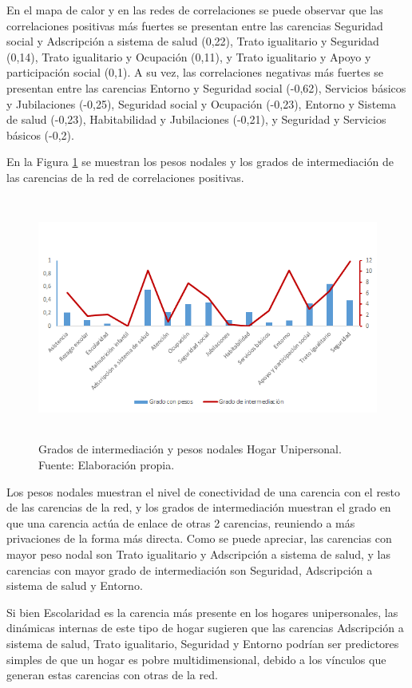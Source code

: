 \documentclass[12pt,letterpaper,spanish]{article}
\begin{document}
En el mapa de calor y en las redes de correlaciones se puede observar que las correlaciones positivas más fuertes se presentan entre las carencias Seguridad social y Adscripción a sistema de salud (0,22), Trato igualitario y Seguridad (0,14), Trato igualitario y Ocupación (0,11), y Trato igualitario y Apoyo y participación social (0,1). A su vez, las correlaciones negativas más fuertes se presentan entre las carencias Entorno y Seguridad social (-0,62), Servicios básicos y Jubilaciones (-0,25), Seguridad social y Ocupación (-0,23), Entorno y Sistema de salud (-0,23), Habitabilidad y Jubilaciones (-0,21), y Seguridad y Servicios básicos (-0,2).

En la Figura \ref{CenUni} se muestran los pesos nodales y los grados de intermediación de las carencias de la red de correlaciones positivas.
\begin{figure}[H]
    \centering
    \includegraphics[height=8cm]{Grafos/nc_unipersonal.png}
    \caption{Grados de intermediación y pesos nodales Hogar Unipersonal. Fuente: Elaboración propia.}
    \label{CenUni}
\end{figure}
Los pesos nodales muestran el nivel de conectividad de una carencia con el resto de las carencias de la red, y los grados de intermediación muestran el grado en que una carencia actúa de enlace de otras 2 carencias, reuniendo a más privaciones de la forma más directa. Como se puede apreciar, las carencias con mayor peso nodal son Trato igualitario y Adscripción a sistema de salud, y las carencias con mayor grado de intermediación son Seguridad, Adscripción a sistema de salud y Entorno. 

Si bien Escolaridad es la carencia más presente en los hogares unipersonales, las dinámicas internas de este tipo de hogar sugieren que las carencias Adscripción a sistema de salud, Trato igualitario, Seguridad y Entorno podrían ser predictores simples de que un hogar es pobre multidimensional, debido a los vínculos que generan estas carencias con otras de la red. 
\end{document}
